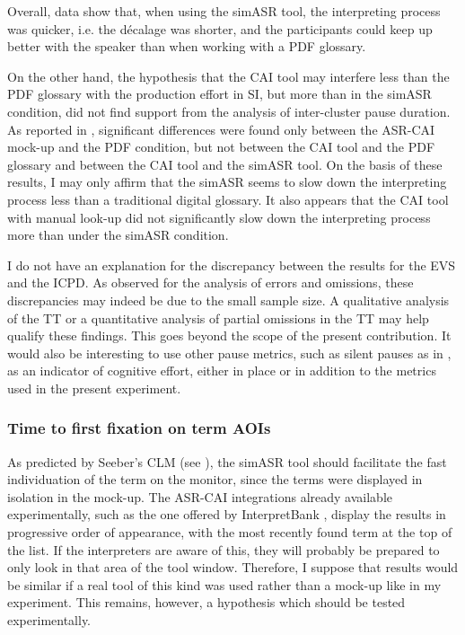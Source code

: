 Overall, data show that, when using the simASR tool, the interpreting process was quicker, i.e. the décalage was shorter, and the participants could keep up better with the speaker than when working with a PDF glossary.

On the other hand, the hypothesis that the CAI tool may interfere less than the PDF glossary with the production effort in SI, but more than in the simASR condition, did not find support from the analysis of inter-cluster pause duration. As reported in , significant differences were found only between the ASR-CAI mock-up and the PDF condition, but not between the CAI tool and the PDF glossary and between the CAI tool and the simASR tool. On the basis of these results, I may only affirm that the simASR seems to slow down the interpreting process less than a traditional digital glossary. It also appears that the CAI tool with manual look-up did not significantly slow down the interpreting process more than under the simASR condition.

I do not have an explanation for the discrepancy between the results for the EVS and the ICPD. As observed for the analysis of errors and omissions, these discrepancies may indeed be due to the small sample size. A qualitative analysis of the TT or a quantitative analysis of partial omissions in the TT may help qualify these findings. This goes beyond the scope of the present contribution. It would also be interesting to use other pause metrics, such as silent pauses as in \citet{gieshoff_impact_2021}, as an indicator of cognitive effort, either in place or in addition to the metrics used in the present experiment.

\subsubsection{Time to first fixation on term AOIs} \label{timefirstfixdisc}
As predicted by Seeber's CLM (see ), the simASR tool should facilitate the fast individuation of the term on the monitor, since the terms were displayed in isolation in the mock-up. The ASR-CAI integrations already available experimentally, such as the one offered by InterpretBank \citep{fantinuoli_computer-assisted_2017}, display the results in progressive order of appearance, with the most recently found term at the top of the list. If the interpreters are aware of this, they will probably be prepared to only look in that area of the tool window. Therefore, I suppose that results would be similar if a real tool of this kind was used rather than a mock-up like in my experiment. This remains, however, a hypothesis which should be tested experimentally.

